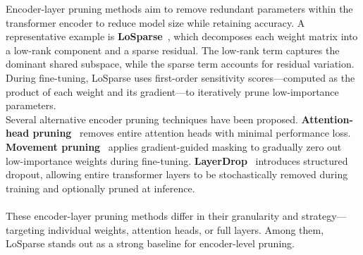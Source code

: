\documentclass[twocolumn]{article}
\begin{document}
Encoder-layer pruning methods aim to remove redundant parameters within the transformer encoder to reduce model size while retaining accuracy. A representative example is \textbf{LoSparse}~\cite{li2023losparse}, which decomposes each weight matrix into a low-rank component and a sparse residual. The low-rank term captures the dominant shared subspace, while the sparse term accounts for residual variation. During fine-tuning, LoSparse uses first-order sensitivity scores—computed as the product of each weight and its gradient—to iteratively prune low-importance parameters. 
\\
Several alternative encoder pruning techniques have been proposed. \textbf{Attention-head pruning}~\cite{michel2019sixteen} removes entire attention heads with minimal performance loss. \textbf{Movement pruning}~\cite{sanh2020movement} applies gradient-guided masking to gradually zero out low-importance weights during fine-tuning. \textbf{LayerDrop}~\cite{fan2020layerdrop} introduces structured dropout, allowing entire transformer layers to be stochastically removed during training and optionally pruned at inference.
\\ \\
These encoder-layer pruning methods differ in their granularity and strategy—targeting individual weights, attention heads, or full layers. Among them, LoSparse stands out as a strong baseline for encoder-level pruning.
\end{document}
